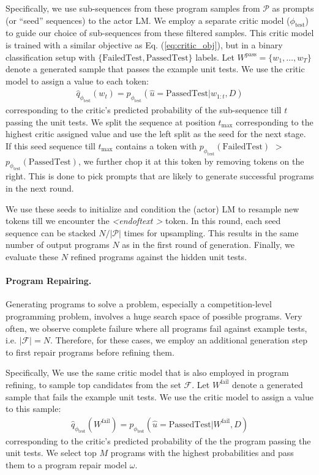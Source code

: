 \documentclass{article}
\begin{document}
Specifically, we use sub-sequences from these program samples from $\mathcal{P}$ as prompts (or ``seed'' sequences) to the actor LM. We employ a separate critic model ($\phi_\text{test}$) to guide our choice of sub-sequences from these filtered samples. This critic model is trained with a similar objective as Eq. (\ref{eq:critic_obj}), but in a binary classification setup with $\{\mathrm{FailedTest, PassedTest}\}$ labels.
Let $W^\mathrm{pass} = \{ w_{1}, \dots, w_T \}$ denote a generated sample that passes the example unit tests. We use the critic model to assign a value to each token:
\begin{align}
\hat{q}_{\phi_{\text{test}}}(w_t) = p_{\phi_\text{test}}(\hat{u}=\mathrm{PassedTest} | w_{1:t}, D)
\end{align}
corresponding to the critic's predicted probability of the sub-sequence till $t$ passing the unit tests. 
We split the sequence at position $t_\text{max}$ corresponding to the highest critic assigned value and use the left split as the seed for the next stage. 
If this seed sequence till $t_\text{max}$ contains a token with $p_{\phi_{\text{test}}}(\mathrm{FailedTest})$ $>$ $p_{\phi_{\text{test}}}(\mathrm{PassedTest})$, we further chop it at this token by removing tokens on the right. This is done to pick prompts that are likely to generate successful programs in the next round.

We use these seeds to initialize and condition the (actor) LM to resample new tokens till we encounter the \emph{\textless endoftext \textgreater} token. 
In this round, each seed sequence can be stacked $N/|\mathcal{P}|$ times for upsampling. This results in the same number of output programs $N$ as in the first round of generation.
Finally, we evaluate these $N$ refined programs against the hidden unit tests.

\paragraph{Program Repairing.}
Generating programs to solve a problem, especially a competition-level programming problem, involves a huge search space of possible programs.
Very often, we observe complete failure where all programs fail against example tests, i.e. $|\mathcal{F}|=N$.
Therefore, for these cases, we employ an additional generation step to first repair programs before refining them. 

Specifically, We use the same critic model that is also employed in program refining, to sample top candidates from the set $\mathcal{F}$.
Let $W^\mathrm{fail}$ denote a generated sample that fails the example unit tests. We use the critic model to assign a value to this sample: 
\begin{align}
    \hat{q}_{\phi_{\text{test}}}(W^\mathrm{fail}) = p_{\phi_\text{test}}(\hat{u}=\mathrm{PassedTest} | W^\mathrm{fail}, D)
\end{align}
corresponding to the critic's predicted probability of the the program passing the unit tests. 
We select top $M$ programs with the highest probabilities and pass them to a program repair model $\omega$.
\end{document}
